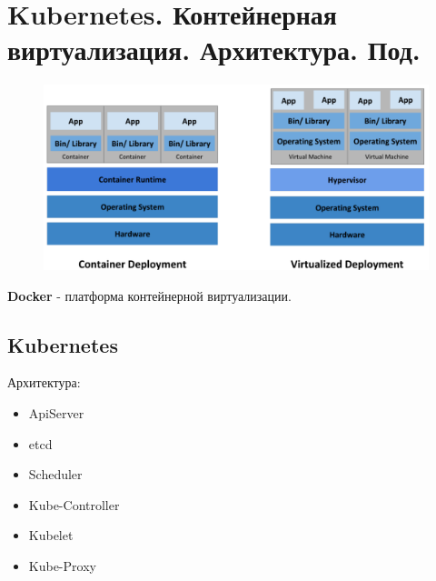 \section{Kubernetes. Контейнерная виртуализация. Архитектура. Под.}



\begin{figure}[H]
	\centering
	\begin{minipage}[b]{0.8\textwidth}
		\includegraphics[width=\textwidth]{images/cdep.png}
	\end{minipage}
\end{figure}

\textbf{Docker} - платформа контейнерной виртуализации.

\subsection*{Kubernetes}


Архитектура:
\begin{itemize}
    \item ApiServer
    \item etcd
    \item Scheduler
    \item Kube-Controller
    \item Kubelet
    \item Kube-Proxy
\end{itemize}

